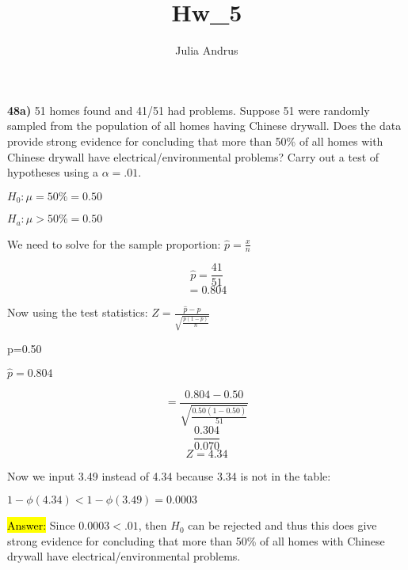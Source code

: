 \documentclass{article}
\title{Hw\_5}
\author{Julia Andrus}
\date{}
\begin{document}
\maketitle

\textbf{48a)} 51 homes found and 41/51 had problems. Suppose 51 were randomly sampled from the population of all homes having Chinese drywall. Does the data provide strong evidence for concluding that more than 50\% of all homes with Chinese drywall have electrical/environmental problems? Carry out a test of hypotheses using a $\alpha= .01$.

\vspace{2mm}

$H_{0}: \mu=50\%=0.50$

\vspace{2mm}

$H_{a}: \mu>50\%=0.50$

\vspace{2mm}

We need to solve for the sample proportion: $\hat{p}=\frac{x}{n}$

$$\hat{p}=\frac{41}{51}$$
$$=0.804$$

Now using the test statistics: $Z=\frac{\hat{p}-p}{\sqrt{\frac{p(1-p)}{n}}}$

\vspace{2mm}

p=0.50

\vspace{2mm}

$\hat{p}=0.804$

\vspace{2mm}

$$=\frac{0.804-0.50}{\sqrt{\frac{0.50(1-0.50)}{51}}}$$
$$\frac{0.304}{0.070}$$
$$Z=4.34$$

Now we input 3.49 instead of 4.34 because 3.34 is not in the table:

\vspace{2mm}

$1-\phi(4.34)<1-\phi(3.49)=0.0003$

\vspace{2mm}

\hl{Answer:} Since $0.0003 < .01$, then $H_{0}$ can be rejected and thus this does give strong evidence for concluding that more than 50\% of all homes with Chinese drywall have electrical/environmental problems.



\vspace{5mm}
\end{document}
